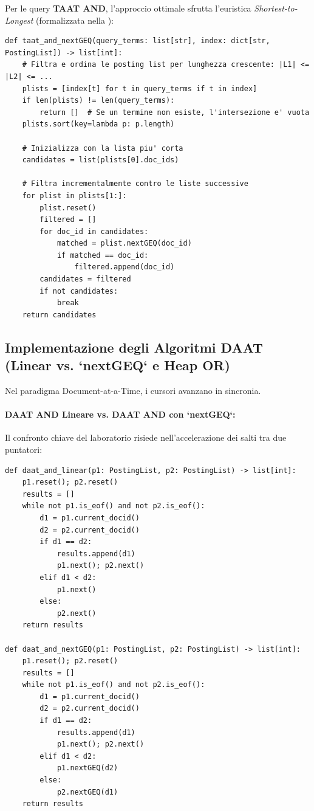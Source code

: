 Per le query \textbf{TAAT AND}, l'approccio ottimale sfrutta l'euristica \textit{Shortest-to-Longest} (formalizzata nella ):
\begin{lstlisting}[style=pythoncode, caption={Algoritmo TAAT AND con euristica Shortest-to-Longest e salti `nextGEQ`.}, label={lst:python-taat-and}]
def taat_and_nextGEQ(query_terms: list[str], index: dict[str, PostingList]) -> list[int]:
    # Filtra e ordina le posting list per lunghezza crescente: |L1| <= |L2| <= ...
    plists = [index[t] for t in query_terms if t in index]
    if len(plists) != len(query_terms):
        return []  # Se un termine non esiste, l'intersezione e' vuota
    plists.sort(key=lambda p: p.length)

    # Inizializza con la lista piu' corta
    candidates = list(plists[0].doc_ids)

    # Filtra incrementalmente contro le liste successive
    for plist in plists[1:]:
        plist.reset()
        filtered = []
        for doc_id in candidates:
            matched = plist.nextGEQ(doc_id)
            if matched == doc_id:
                filtered.append(doc_id)
        candidates = filtered
        if not candidates:
            break
    return candidates
\end{lstlisting}

\FloatBarrier
\subsection{Implementazione degli Algoritmi DAAT (Linear vs. `nextGEQ` e Heap OR)}
\label{subsec:python-daat-impl}
Nel paradigma Document-at-a-Time, i cursori avanzano in sincronia.

\paragraph{DAAT AND Lineare vs. DAAT AND con `nextGEQ`:}
Il confronto chiave del laboratorio risiede nell'accelerazione dei salti tra due puntatori:
\begin{lstlisting}[style=pythoncode, caption={Confronto tra DAAT AND a passi unitari e DAAT AND con `nextGEQ`.}, label={lst:python-daat-and-comp}]
def daat_and_linear(p1: PostingList, p2: PostingList) -> list[int]:
    p1.reset(); p2.reset()
    results = []
    while not p1.is_eof() and not p2.is_eof():
        d1 = p1.current_docid()
        d2 = p2.current_docid()
        if d1 == d2:
            results.append(d1)
            p1.next(); p2.next()
        elif d1 < d2:
            p1.next()
        else:
            p2.next()
    return results

def daat_and_nextGEQ(p1: PostingList, p2: PostingList) -> list[int]:
    p1.reset(); p2.reset()
    results = []
    while not p1.is_eof() and not p2.is_eof():
        d1 = p1.current_docid()
        d2 = p2.current_docid()
        if d1 == d2:
            results.append(d1)
            p1.next(); p2.next()
        elif d1 < d2:
            p1.nextGEQ(d2)
        else:
            p2.nextGEQ(d1)
    return results
\end{lstlisting}

